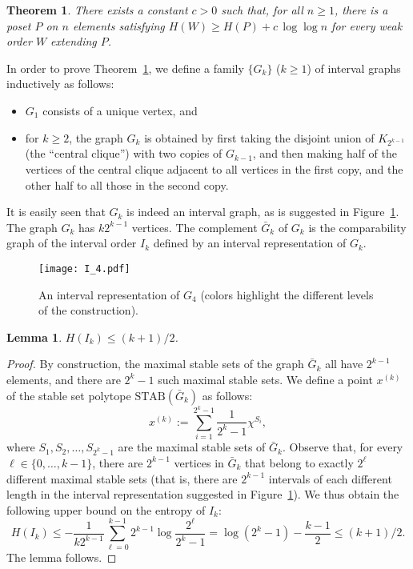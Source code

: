 \documentclass[12pt,oneside]{article}
\newtheorem{lemma}{Lemma}
\newtheorem{theorem}{Theorem}
\newcommand{\STAB}{\mathrm{STAB}}
\begin{document}
\begin{theorem}
\label{th-tight}
There exists a constant $c > 0$ such that, for all $n\geq 1$, there is
a poset $P$ on $n$ elements satisfying $H(W) \geq H(P) + c\,\log\log n$
for every weak order $W$ extending $P$.
\end{theorem}

In order to prove Theorem~\ref{th-tight}, we define a family $\{G_{k}\}$ ($k\geq 1$)
of interval graphs inductively as follows:
\begin{itemize}
\item $G_{1}$ consists of a unique vertex, and
\item for $k\geq 2$, the graph $G_{k}$ is obtained by first taking the disjoint union of
$K_{2^{k-1}}$ (the ``central clique'') with two copies of $G_{k-1}$, and then making half
of the vertices of the central clique adjacent to all vertices in the first copy, and the other half
to all those in the second copy.
\end{itemize}
It is easily seen that $G_{k}$ is indeed an interval graph, as is suggested
in Figure~\ref{fig-tight}. The graph $G_{k}$ has $k2^{k-1}$ vertices.
The complement $\bar G_{k}$ of $G_{k}$ is the comparability
graph of the interval order $I_{k}$ defined by an interval representation of $G_{k}$.

\begin{figure}
\centering
\texttt{[image: I\_4.pdf]}
\caption{\label{fig-tight} An interval representation of $G_{4}$ (colors highlight the different
levels of the construction).}
\end{figure}

\begin{lemma}
\label{lem-tight-koerner}
$H(I_{k}) \leq (k+1)/2$.
\end{lemma}
\begin{proof}
By construction, the maximal stable sets of the graph $\bar G_{k}$ all have $2^{k-1}$ elements,
and there are $2^{k}-1$ such maximal stable sets.
We define a point $x^{(k)}$ of the stable set polytope $\STAB(\bar G_{k})$ as follows:
$$
x^{(k)} := \sum_{i=1}^{2^{k}-1}  \frac{1}{2^{k}-1}   \chi^{S_{i}},
$$
where $S_{1}, S_{2}, \dots, S_{2^{k}-1}$ are the maximal stable sets of $\bar G_{k}$. Observe that, for every $\ell \in \{0, \dots,  k-1\}$, there are $2^{k-1}$ vertices in $\bar G_{k}$ that belong to exactly $2^{\ell}$ different maximal stable sets (that is, there are $2^{k-1}$ intervals of each different length in the interval representation suggested in Figure~\ref{fig-tight}). We thus obtain the following upper bound on the entropy of $I_{k}$:
\begin{equation*}
H(I_{k})
\leq -\frac 1{k2^{k-1}}\sum_{\ell=0}^{k-1} 2^{k-1}\log{\frac{ 2^{\ell}}{2^{k}-1} }=\log{(2^k-1)}-\frac{k-1}{2}\leq (k+1)/2.
\end{equation*}
The lemma follows.
\end{proof}
\end{document}
